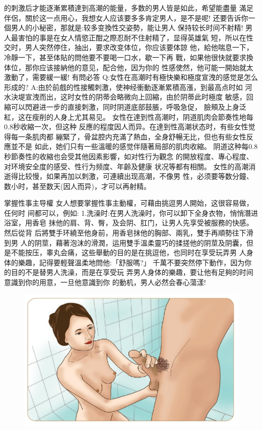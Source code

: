 \documentclass[12pt,UTF8]{ctexbook}
\begin{document}
的刺激后才能逐漸累積達到高潮的能量，多数的男人皆是如此，希望能盡量
滿足伴侶，關於这一点用心，我想女人应该要多多肯定男人，是不是呢!
还要告诉你一個男人的小秘密，那就是:较多变換性交姿勢，能让男人
保持较长时间不射精!
男人最害怕的事是在女人情慾正酣之際忍耐不住射精了，显得英雄氣
短，所以在性交时，男人突然停住，抽出，要求改变体位，你应该要体諒
他，給他喘息一下，冷靜一下，甚至体貼的問他要不要喝一口水，歇一下再
戰，如果他很快就要求換体位，那你应该接納他的意见，配合他，因为你的
性感使然，他可能一開始就太激動了，需要緩一緩!
有問必答
Q:女性在高潮时有極快樂和極度宣洩的感觉是怎么形成的?
A:由於前戲的性接觸刺激，使神经衝動逐漸累積高漲，到最高点时如
河水決堤宣洩而出，这时女性的阴蒂会略微向上回縮，由於阴蒂此时極度
敏感，回縮可以閃避进一步的直接刺激，同时阴道底部鼓脹，呼吸急促，
臉頰及上身泛紅，这在瘦削的人身上尤其易见。
女性在達到性高潮时，阴道肌肉会節奏性地每0.8秒收縮一次，但这种
反應的程度因人而异。在達到性高潮状态时，有些女性觉得每一条肌肉都
繃緊了，骨盆腔内充滿了熱血，全身舒暢无比，但也有些女性反應並不是
如此，她们只有一些溫暖的感觉伴隨著局部的肌肉收縮。
阴道这种每0.8秒節奏性的收縮也会受其他因素影響，如对性行为觀念
的開放程度、專心程度、对环境安全度的感受、性行为频度、年齡及健康
状况等都有相關。
女性的高潮消逝得比较慢，如果再加以刺激，可連續出现高潮，不像男
性，必须要等数分鐘、数小时，甚至数天(因人而异)，才可以再射精。

掌握性事主导權
女人想要掌握性事主動權，可藉由挑逗男人開始，这很容易做，任何时
间都可以，例如:
1.洗澡时:在男人洗澡时，你可以卸下全身衣物，悄悄潛进浴室，用香皂
抹他的肩、背、臀，及会阴、肛门，让男人先享受被服務的快感。然后從背
后將雙手环繞至他身前，用香皂抹他的胸部、兩乳，雙手再順勢往下滑到男
人的阴莖，藉著泡沫的滑潤，运用雙手溫柔靈巧的揉搓他的阴莖及阴囊，但
是不能按压，睾丸会痛，这些舉動的目的是在挑逗他，也同时在享受玩弄男
人身体的樂趣，記得要輕聲溫柔地問他:「舒服嗎?」
千萬不要突然停下動作，因为你的目的不是替男人洗澡，而是在享受玩
弄男人身体的樂趣，要让他有足夠的时间意識到你的用意，一旦他意識到你
的動机，男人必然会春心蕩漾!

\begin{figure}[htbp]
	\centering
	\includegraphics[width=0.7\linewidth]{14}
	\caption{}
	\label{fig:1}
\end{figure}
\end{document}
